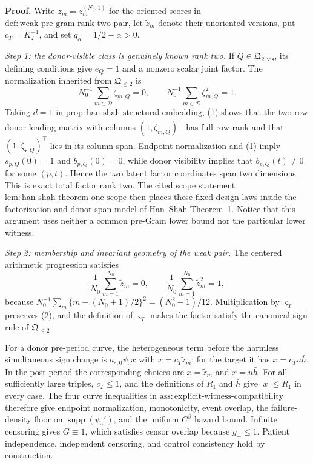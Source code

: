 \textbf{Proof.}
Write \(z_m=z_m^{(N_0,1)}\) for the oriented scores in \(\mathrm{def:weak\mbox{-}pre\mbox{-}gram\mbox{-}rank\mbox{-}two\mbox{-}pair}\), let \(\widetilde z_m\) denote their unoriented versions, put \(c_T=K_T^{-1}\), and set \(q_\alpha=1/2-\alpha>0\).

\emph{Step 1: the donor-visible class is genuinely known rank two.}
If \(Q\in\mathfrak Q_{2,\mathrm{vis}}\), its defining conditions give \(e_Q=1\) and a nonzero scalar joint factor.  The normalization inherited from \(\mathfrak Q_{\le2}\) is
\[
 N_0^{-1}\sum_{m\in\mathcal D}\zeta_{m,Q}=0,
 \qquad
 N_0^{-1}\sum_{m\in\mathcal D}\zeta_{m,Q}^2=1.       \tag{1}
\]
Taking \(d=1\) in \(\mathrm{prop:han\mbox{-}shah\mbox{-}structural\mbox{-}embedding}\), (1) shows that the two-row donor loading matrix with columns \((1,\zeta_{m,Q})^\top\) has full row rank and that \((1,\zeta_{\star,Q})^\top\) lies in its column span.  Endpoint normalization and (1) imply \(s_{p,Q}(0)=1\) and \(b_{p,Q}(0)=0\), while donor visibility implies that \(b_{p,Q}(t)\ne0\) for some \((p,t)\).  Hence the two latent factor coordinates span two dimensions.  This is exact total factor rank two.  The cited scope statement \(\mathrm{lem:han\mbox{-}shah\mbox{-}theorem\mbox{-}one\mbox{-}scope}\) then places these fixed-design laws inside the factorization-and-donor-span model of Han--Shah Theorem~1.  Notice that this argument uses neither a common pre-Gram lower bound nor the particular lower witness.

\emph{Step 2: membership and invariant geometry of the weak pair.}
The centered arithmetic progression satisfies
\[
 \frac1{N_0}\sum_{m=1}^{N_0}\widetilde z_m=0,
 \qquad
 \frac1{N_0}\sum_{m=1}^{N_0}\widetilde z_m^2=1,       \tag{2}
\]
because \(N_0^{-1}\sum_m\{m-(N_0+1)/2\}^2=(N_0^2-1)/12\).  Multiplication by \(\varsigma_T\) preserves (2), and the definition of \(\varsigma_T\) makes the factor satisfy the canonical sign rule of \(\mathfrak Q_{\le2}\).

For a donor pre-period curve, the heterogeneous term before the harmless simultaneous sign change is \(a_{\circ,0}\psi_\circ x\) with \(x=c_T\widetilde z_m\); for the target it has \(x=c_Tu\bar h\).  In the post period the corresponding choices are \(x=\widetilde z_m\) and \(x=u\bar h\).  For all sufficiently large triples, \(c_T\le1\), and the definitions of \(R_1\) and \(\bar h\) give \(|x|\le R_1\) in every case.  The four curve inequalities in \(\mathrm{ass:explicit\mbox{-}witness\mbox{-}compatibility}\) therefore give endpoint normalization, monotonicity, event overlap, the failure-density floor on \(\operatorname{supp}(\psi_\circ')\), and the uniform \(C^\beta\) hazard bound.  Infinite censoring gives \(G\equiv1\), which satisfies censor overlap because \(g_-\le1\).  Patient independence, independent censoring, and control consistency hold by construction.

